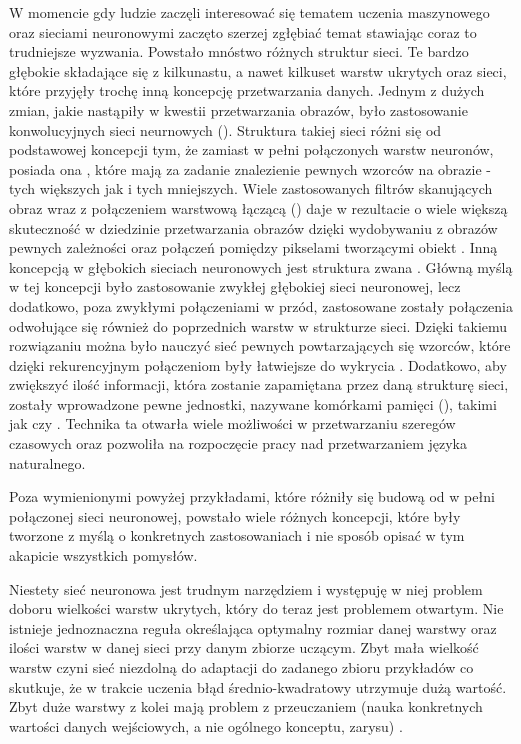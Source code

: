 W momencie gdy ludzie zaczęli interesować się tematem uczenia maszynowego oraz sieciami neuronowymi zaczęto szerzej zgłębiać temat stawiając coraz to trudniejsze wyzwania. Powstało mnóstwo różnych struktur sieci. Te bardzo głębokie składające się z kilkunastu, a nawet kilkuset warstw ukrytych oraz sieci, które przyjęły trochę inną koncepcję przetwarzania danych. Jednym z dużych zmian, jakie nastąpiły w kwestii przetwarzania obrazów, było zastosowanie konwolucyjnych sieci neurnowych ()\cite{CNN}. Struktura takiej sieci różni się od podstawowej koncepcji tym, że zamiast w pełni połączonych warstw neuronów, posiada ona , które mają za zadanie znalezienie pewnych wzorców na obrazie - tych większych jak i tych mniejszych. Wiele zastosowanych filtrów skanujących obraz wraz z połączeniem warstwową łączącą () daje w rezultacie o wiele większą skuteczność w dziedzinie przetwarzania obrazów dzięki wydobywaniu z obrazów pewnych zależności oraz połączeń pomiędzy pikselami tworzącymi obiekt \cite{Prezentacja:KKCNN} \cite{Prezentacja:CNNintro}.
Inną koncepcją w głębokich sieciach neuronowych jest struktura zwana   \cite{Prezentacja:KKRNN}. Główną myślą w tej koncepcji było zastosowanie zwykłej głębokiej sieci neuronowej, lecz dodatkowo, poza zwykłymi połączeniami w przód, zastosowane zostały połączenia odwołujące się również do poprzednich warstw w strukturze sieci. Dzięki takiemu rozwiązaniu można było nauczyć sieć pewnych powtarzających się wzorców, które dzięki rekurencyjnym połączeniom były łatwiejsze do wykrycia \cite{Geron2}. Dodatkowo, aby zwiększyć ilość informacji, która zostanie zapamiętana przez daną strukturę sieci, zostały wprowadzone pewne jednostki, nazywane komórkami pamięci (), takimi jak  \cite{LSTM} czy  \cite{GRU}. Technika ta otwarła wiele możliwości w przetwarzaniu szeregów czasowych oraz pozwoliła na rozpoczęcie pracy nad przetwarzaniem języka naturalnego.

Poza wymienionymi powyżej przykładami, które różniły się budową od w pełni połączonej sieci neuronowej, powstało wiele różnych koncepcji, które były tworzone z myślą o konkretnych zastosowaniach i nie sposób opisać w tym akapicie wszystkich pomysłów.

Niestety sieć neuronowa jest trudnym narzędziem i występuję w niej problem doboru wielkości warstw ukrytych, który do teraz jest problemem otwartym. 
Nie istnieje jednoznaczna reguła określająca optymalny rozmiar danej warstwy oraz ilości warstw w danej sieci przy danym zbiorze uczącym. Zbyt mała wielkość warstw czyni sieć niezdolną do adaptacji do
zadanego zbioru przykładów co skutkuje, że w trakcie uczenia błąd
średnio-kwadratowy utrzymuje dużą wartość. Zbyt duże warstwy z kolei mają problem z przeuczaniem (nauka konkretnych wartości danych wejściowych, a nie ogólnego konceptu, zarysu) \cite{Prezentacja:SNN}.

